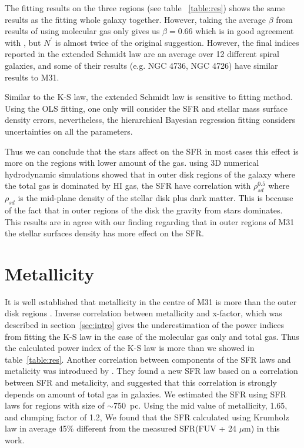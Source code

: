 \documentclass[useAMS,usenatbib]{mn2e}
\newcommand \eqnprime {N^\prime}
\begin{document}
The fitting results on the three regions (see table ~\ref{table:res}) shows the same results as the fitting whole galaxy together. However, taking the average $\beta$ from results of using molecular gas only gives us $\beta = 0.66$ which is in good agreement with \cite{Shi11}, but $\eqnprime$ is almost twice of the original suggestion. However, the final indices reported in the extended Schmidt law are an average over 12 different spiral galaxies, and some of their results (e.g. NGC 4736, NGC 4726) have similar results to M31. 

Similar to the K-S law, the extended Schmidt law is sensitive to fitting method. Using the OLS fitting, one only will consider the SFR and stellar mass surface density errors, nevertheless, the hierarchical Bayesian regression fitting considers uncertainties on all the parameters.
 

Thus we can conclude that the stars affect on the SFR in most cases this effect is more on the regions with lower amount of the gas. \cite{Kim13} using 3D numerical hydrodynamic simulations showed that in outer disk regions of the galaxy  where the total gas is dominated by HI gas, the SFR have correlation with $\rho_{sd}^{0.5}$ where $\rho_{sd}$ is the mid-plane density of the stellar disk plus dark matter. This is because of the fact that in outer regions of the disk the gravity from stars dominates. This results are in agree with our finding regarding that in outer regions of M31 the stellar surfaces density has more effect on the SFR.%

\section{Metallicity}

It is well established that metallicity in the centre of M31 is more than the outer disk regions \citep[e.g.][]{Draine14}. Inverse correlation between metallicity and x-factor, which was described in section~\ref{sec:intro} gives the underestimation of the power indices from fitting the K-S law in the case of the molecular gas only and total gas. Thus the calculated power index of the K-S law is more than we showed in table~\ref{table:res}. Another correlation between components of the SFR laws and metalicity was introduced by \cite{Krumholz09}. They found a new SFR law based on a correlation between SFR and metalicity, and suggested that this correlation is strongly depends on amount of total gas in galaxies. We estimated the SFR using \cite{Krumholz09} SFR laws for regions with size of $\sim$750~pc. Using the mid value of metallicity, 1.65, and clumping factor of 1.2, We found that the SFR calculated using Krumholz law in average 45$\%$ different from the measured SFR(FUV + 24 $\mu$m) in this work. %
\end{document}
